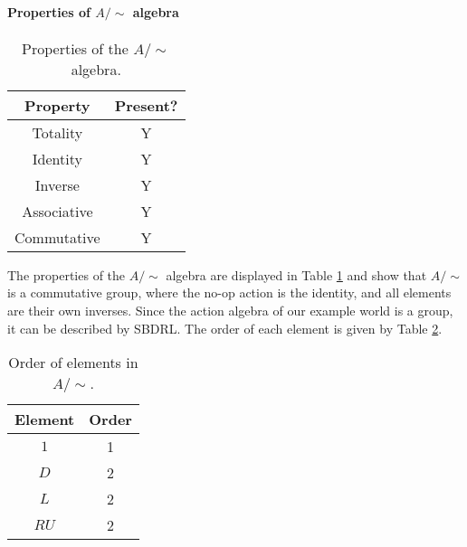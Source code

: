 \paragraph{Properties of $A/\sim$ algebra}

\begin{table}
    \centering
    \begin{tabular}{c|c}
        \textbf{Property}   & \textbf{Present?} \\
        \hline
        Totality            & Y\\
        Identity            & Y\\
        Inverse             & Y\\
        Associative         & Y\\
        Commutative         & Y
    \end{tabular}
    \caption{Properties of the $A/\sim$ algebra.}
    \label{tab:2x2-gridworld-no-walls-algebra-properties}
\end{table}

The properties of the $A/\sim$ algebra are displayed in Table \ref{tab:2x2-gridworld-no-walls-algebra-properties} and show that $A/\sim$ is a commutative group, where the no-op action is the identity, and all elements are their own inverses.
Since the action algebra of our example world is a group, it can be described by SBDRL.
The order of each element is given by Table \ref{tab:2x2-gridworld-no-walls-element orders}.

\begin{table}
    \centering
    \begin{tabular}{c|c}
        \textbf{Element}   & \textbf{Order} \\
        \hline
        $1$     & 1\\
        $D$     & 2\\
        $L$     & 2\\
        $RU$    & 2
    \end{tabular}
    \caption{Order of elements in $A/\sim$.}
    \label{tab:2x2-gridworld-no-walls-element orders}
\end{table}
